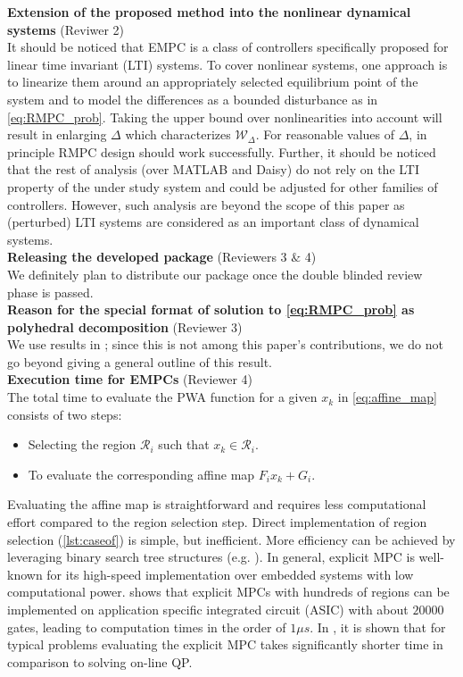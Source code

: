 {\textbf{Extension of the proposed method into the nonlinear dynamical systems} (Reviwer 2)\\
It should be noticed that EMPC is a class of controllers specifically proposed for linear time invariant (LTI) systems. To cover nonlinear systems, one approach is to linearize them around an appropriately selected equilibrium point of the system and to model the differences as a bounded disturbance as in \autoref{eq:RMPC_prob}. Taking the upper bound over nonlinearities into account will result in enlarging $\Delta$ which characterizes $\mathcal{W}_{\Delta}$. For reasonable values of $\Delta$, in principle RMPC design should work successfully. Further, it should be noticed that the rest of analysis (over MATLAB and Daisy) do not rely on the LTI property of the under study system and could be adjusted for other families of controllers. However, such analysis are beyond the scope of this paper as (perturbed) LTI systems are considered as an important class of dynamical systems.\\ 
\textbf{Releasing the developed package} (Reviewers 3 $\&$ 4)\\
We definitely plan to distribute our package once the double blinded review phase is passed.\\ 
\textbf{Reason for the special format of solution to \autoref{eq:RMPC_prob} as polyhedral decomposition} (Reviewer 3)\\
We use results in \cite{delaPea:2005}; since this is not among this paper's contributions, we do not go beyond giving a general outline of this result.
\\
\textbf{Execution time for EMPCs} (Reviewer 4)\\
The total time to evaluate the PWA function for a given $x_k$ in \autoref{eq:affine_map} consists of two steps:
\begin{itemize}
\item Selecting the region $\mathcal R_i$ such that $x_k\in \mathcal R_i$.
\item To evaluate the corresponding affine map $F_i x_k +G_i$. 
\end{itemize}
Evaluating the affine map is straightforward and requires less computational effort compared to the region selection step. Direct implementation of region selection (\autoref{lst:caseof}) is simple, but inefficient. More efficiency can be achieved by leveraging binary search tree structures (e.g. \cite{Mnnigmann:2011}). In general, explicit MPC is well-known for its high-speed implementation over embedded systems with low computational power. \cite{Johansen:2007} shows that explicit MPCs with hundreds of regions can be implemented on application specific integrated circuit (ASIC) with about $20000$ gates, leading to computation times in the order of $1\mu s$. In \cite{Bemporad:2006}, it is shown that for typical problems evaluating the explicit MPC takes significantly shorter time in comparison to solving on-line QP. \\
}
